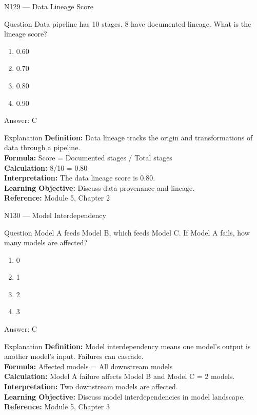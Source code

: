 \documentclass[aspectratio=169,8pt]{beamer}
\begin{document}
	\begin{frame}{N129 --- Data Lineage Score}
		\begin{block}{Question}
			Data pipeline has 10 stages. 8 have documented lineage. What is the lineage score?
			\begin{enumerate}
				\item 0.60
				\item 0.70
				\item 0.80
				\item 0.90
			\end{enumerate}
		\end{block}
		\begin{exampleblock}{Answer: C}\end{exampleblock}
		\begin{block}{Explanation}
			\textbf{Definition:} Data lineage tracks the origin and transformations of data through a pipeline.\\
			\textbf{Formula:} Score = Documented stages / Total stages\\
			\textbf{Calculation:} 8/10 = 0.80\\
			\textbf{Interpretation:} The data lineage score is 0.80.\\
			\textbf{Learning Objective:} Discuss data provenance and lineage.\\
			\textbf{Reference:} Module 5, Chapter 2
		\end{block}
	\end{frame}
	
	\begin{frame}{N130 --- Model Interdependency}
		\begin{block}{Question}
			Model A feeds Model B, which feeds Model C. If Model A fails, how many models are affected?
			\begin{enumerate}
				\item 0
				\item 1
				\item 2
				\item 3
			\end{enumerate}
		\end{block}
		\begin{exampleblock}{Answer: C}\end{exampleblock}
		\begin{block}{Explanation}
			\textbf{Definition:} Model interdependency means one model's output is another model's input. Failures can cascade.\\
			\textbf{Formula:} Affected models = All downstream models\\
			\textbf{Calculation:} Model A failure affects Model B and Model C = 2 models.\\
			\textbf{Interpretation:} Two downstream models are affected.\\
			\textbf{Learning Objective:} Discuss model interdependencies in model landscape.\\
			\textbf{Reference:} Module 5, Chapter 3
		\end{block}
	\end{frame}
	
\end{document}
